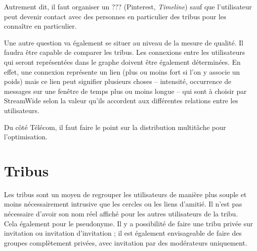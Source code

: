 \documentclass[a4paper]{article}
\begin{document}
Autrement dit, il faut organiser un ??? (Pinterest, \emph{Timeline}) sauf que
l'utilisateur peut devenir contact avec des personnes en particulier des tribus
pour les connaître en particulier.

Une autre question va également se situer au niveau de la mesure de qualité. Il
faudra être capable de comparer les tribus. Les connexions entre les
utilisateurs qui seront représentées dans le graphe doivent être également
déterminées. En effet, une connexion représente un lien (plus ou moins fort si
l'on y associe un poids) mais ce lien peut signifier plusieurs choses --
intensité, occurrence de messages sur une fenêtre de temps plus ou moins longue
-- qui sont à choisir par StreamWide selon la valeur qu'ils accordent aux
différentes relations entre les utilisateurs.

Du côté Télécom, il faut faire le point sur la distribution multit\^ache pour
l'optimisation.

\section*{Tribus}
\label{sec:Tribus}
Les tribus sont un moyen de regrouper les utilisateurs de manière plus souple
et moins nécessairement intrusive que les cercles ou les liens d'amitié. Il
n'est pas nécessaire d'avoir son nom réel affiché pour les autres utilisateurs
de la tribu. Cela également pour le pseudonyme. Il y a possibilité de faire une
tribu privée sur invitation ou invitation d'invitation ; il est également
envisageable de faire des groupes complètement privées, avec invitation par des
modérateurs uniquement.
\end{document}
